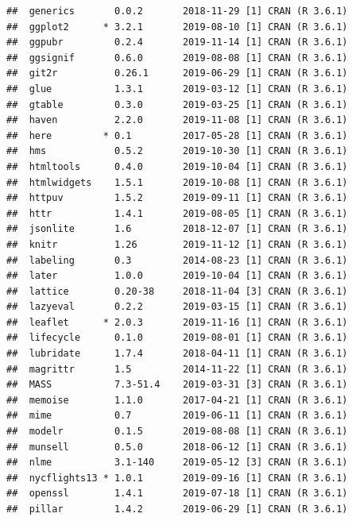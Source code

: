 \documentclass[]{book}
\begin{document}
\begin{verbatim}
##  generics       0.0.2       2018-11-29 [1] CRAN (R 3.6.1)                   
##  ggplot2      * 3.2.1       2019-08-10 [1] CRAN (R 3.6.1)                   
##  ggpubr         0.2.4       2019-11-14 [1] CRAN (R 3.6.1)                   
##  ggsignif       0.6.0       2019-08-08 [1] CRAN (R 3.6.1)                   
##  git2r          0.26.1      2019-06-29 [1] CRAN (R 3.6.1)                   
##  glue           1.3.1       2019-03-12 [1] CRAN (R 3.6.1)                   
##  gtable         0.3.0       2019-03-25 [1] CRAN (R 3.6.1)                   
##  haven          2.2.0       2019-11-08 [1] CRAN (R 3.6.1)                   
##  here         * 0.1         2017-05-28 [1] CRAN (R 3.6.1)                   
##  hms            0.5.2       2019-10-30 [1] CRAN (R 3.6.1)                   
##  htmltools      0.4.0       2019-10-04 [1] CRAN (R 3.6.1)                   
##  htmlwidgets    1.5.1       2019-10-08 [1] CRAN (R 3.6.1)                   
##  httpuv         1.5.2       2019-09-11 [1] CRAN (R 3.6.1)                   
##  httr           1.4.1       2019-08-05 [1] CRAN (R 3.6.1)                   
##  jsonlite       1.6         2018-12-07 [1] CRAN (R 3.6.1)                   
##  knitr          1.26        2019-11-12 [1] CRAN (R 3.6.1)                   
##  labeling       0.3         2014-08-23 [1] CRAN (R 3.6.1)                   
##  later          1.0.0       2019-10-04 [1] CRAN (R 3.6.1)                   
##  lattice        0.20-38     2018-11-04 [3] CRAN (R 3.6.1)                   
##  lazyeval       0.2.2       2019-03-15 [1] CRAN (R 3.6.1)                   
##  leaflet      * 2.0.3       2019-11-16 [1] CRAN (R 3.6.1)                   
##  lifecycle      0.1.0       2019-08-01 [1] CRAN (R 3.6.1)                   
##  lubridate      1.7.4       2018-04-11 [1] CRAN (R 3.6.1)                   
##  magrittr       1.5         2014-11-22 [1] CRAN (R 3.6.1)                   
##  MASS           7.3-51.4    2019-03-31 [3] CRAN (R 3.6.1)                   
##  memoise        1.1.0       2017-04-21 [1] CRAN (R 3.6.1)                   
##  mime           0.7         2019-06-11 [1] CRAN (R 3.6.1)                   
##  modelr         0.1.5       2019-08-08 [1] CRAN (R 3.6.1)                   
##  munsell        0.5.0       2018-06-12 [1] CRAN (R 3.6.1)                   
##  nlme           3.1-140     2019-05-12 [3] CRAN (R 3.6.1)                   
##  nycflights13 * 1.0.1       2019-09-16 [1] CRAN (R 3.6.1)                   
##  openssl        1.4.1       2019-07-18 [1] CRAN (R 3.6.1)                   
##  pillar         1.4.2       2019-06-29 [1] CRAN (R 3.6.1)                   

\end{verbatim}
\end{document}
